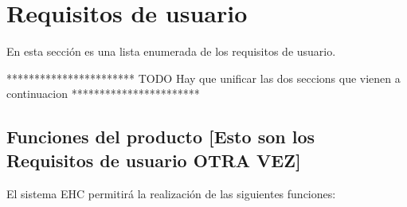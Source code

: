 \chapter{Requisitos de usuario}
    En esta sección es una lista enumerada de los requisitos de usuario.\newline

    ***********************\newline
    TODO Hay que unificar las dos seccions que vienen a continuacion\newline
    ***********************\newline

\section{Funciones del producto [Esto son los Requisitos de usuario OTRA VEZ]}

    El sistema EHC permitirá la realización de las siguientes funciones:

